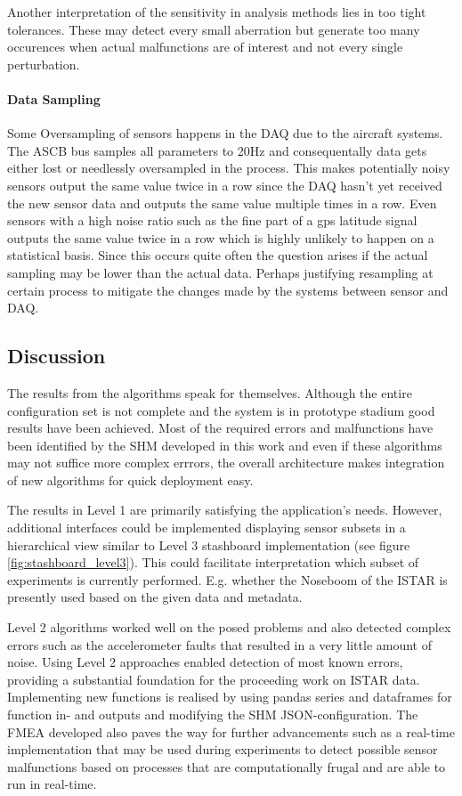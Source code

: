 Another interpretation of the sensitivity in analysis methods lies in too tight tolerances. These may detect every small aberration but generate too many occurences when actual malfunctions are of interest and not every single perturbation.



\paragraph{Data Sampling}
Some Oversampling of sensors happens in the DAQ due to the aircraft systems.
The ASCB bus samples all parameters to 20Hz and consequentally data gets either lost or needlessly oversampled in the process. This makes potentially noisy sensors output the same value twice in a row since the DAQ hasn't yet received the new sensor data and outputs the same value multiple times in a row. Even sensors with a high noise ratio such as the fine part of a gps latitude signal outputs the same value twice in a row which is highly unlikely to happen on a statistical basis. Since this occurs quite often the question arises if the actual sampling may be lower than the actual data. Perhaps justifying resampling at certain process to mitigate the changes made by the systems between sensor and DAQ.



\subsection{Discussion}
The results from the algorithms speak for themselves. Although the entire configuration set is not complete and the system is in prototype stadium good results have been achieved. Most of the required errors and malfunctions have been identified by the SHM developed in this work and even if these algorithms may not suffice more complex errrors, the overall architecture makes integration of new algorithms for quick deployment easy.

The results in Level 1 are primarily satisfying the application's needs. However, additional interfaces could be implemented displaying sensor subsets in a hierarchical view similar to Level 3 stashboard implementation (see figure \ref{fig:stashboard_level3}). This could facilitate interpretation which subset of experiments is currently performed. E.g. whether the Noseboom of the ISTAR is presently used based on the given data and metadata.

Level 2 algorithms worked well on the posed problems and also detected complex errors such as the accelerometer faults that resulted in a very little amount of noise. Using Level 2 approaches enabled detection of most known errors, providing a substantial foundation for the proceeding work on ISTAR data. Implementing new functions is realised by using pandas series and dataframes for function in- and outputs and modifying the SHM JSON-configuration.
The FMEA developed also paves the way for further advancements such as a real-time implementation that may be used during experiments to detect possible sensor malfunctions based on processes that are computationally frugal and are able to run in real-time.

